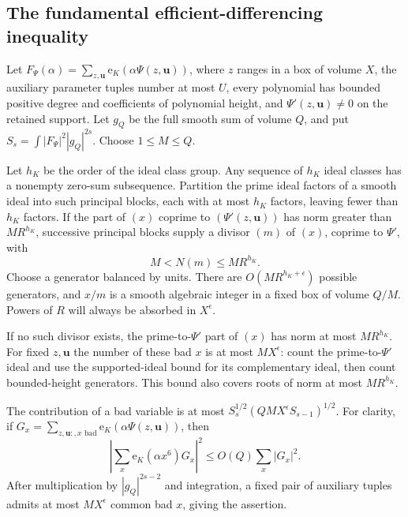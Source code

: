 \documentclass[11pt,reqno]{amsart}
\numberwithin{equation}{section}
\theoremstyle{definition}
\begin{document}
\subsection{The fundamental efficient-differencing inequality}

Let $F_\Psi(\alpha)=\sum_{z,\mathbf u}\mathrm e_K(\alpha\Psi(z,\mathbf u))$,
where $z$ ranges in a box of volume $X$, the auxiliary parameter tuples number
at most $U$, every polynomial has bounded positive degree and coefficients of
polynomial height, and $\Psi'(z,\mathbf u)\ne0$ on the retained support.
Let $g_Q$ be the full smooth sum of volume $Q$, and put
$S_s=\int|F_\Psi|^2|g_Q|^{2s}$.
Choose $1\le M\le Q$.

Let $h_K$ be the order of the ideal class group.  Any sequence of $h_K$ ideal
classes has a nonempty zero-sum subsequence.  Partition the prime ideal factors
of a smooth ideal into such principal blocks, each with at most $h_K$ factors,
leaving fewer than $h_K$ factors.  If the part of $(x)$ coprime to
$(\Psi'(z,\mathbf u))$ has norm greater than $MR^{h_K}$, successive principal
blocks supply a divisor $(m)$ of $(x)$, coprime to $\Psi'$, with
\[
 M<N(m)\le MR^{h_K}.
\]
Choose a generator balanced by units.  There are $O(MR^{h_K+\epsilon})$
possible generators, and $x/m$ is a smooth algebraic integer in a fixed box
of volume $Q/M$.  Powers of $R$ will always be absorbed in $X^\epsilon$.

If no such divisor exists, the prime-to-$\Psi'$ part of $(x)$ has norm at most
$MR^{h_K}$.  For fixed $z,\mathbf u$ the number of these bad $x$ is at most
$MX^\epsilon$: count the prime-to-$\Psi'$ ideal and use the supported-ideal
bound for its complementary ideal, then count bounded-height generators.
This bound also covers roots of norm at most $MR^{h_K}$.

The contribution of a bad variable is at most
$S_s^{1/2}(QMX^\epsilon S_{s-1})^{1/2}$.
For clarity, if
$G_x=\sum_{z,\mathbf u:,x\text{ bad}}\mathrm e_K(\alpha\Psi(z,\mathbf u))$,
then
\[
 \left|\sum_x\mathrm e_K(\alpha x^6)G_x\right|^2
 \le O(Q)\sum_x|G_x|^2.
\]
After multiplication by $|g_Q|^{2s-2}$ and integration, a fixed pair of auxiliary
tuples admits at most $MX^\epsilon$ common bad $x$, giving the assertion.
\end{document}
